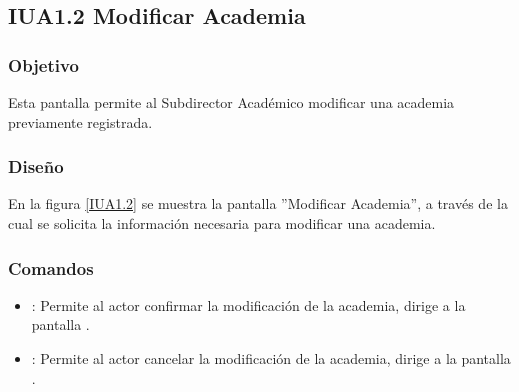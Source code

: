 \subsection{IUA1.2 Modificar Academia}

\subsubsection{Objetivo}
	Esta pantalla permite al Subdirector Académico modificar una academia previamente registrada.

\subsubsection{Diseño}

	En la figura \ref{IUA1.2} se muestra la pantalla ''Modificar Academia'', a través de la cual se solicita la información necesaria para modificar una academia.


\subsubsection{Comandos}
\begin{itemize}
	\item {}: Permite al actor confirmar la modificación de la academia, dirige a la pantalla .
	
	\item {}: Permite al actor cancelar la modificación de la academia, dirige a la pantalla .
\end{itemize}
